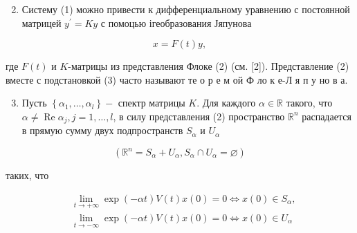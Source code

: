 \documentclass[10pt]{article}
\begin{document}
\begin{enumerate}

  \setcounter{enumi}{1}

  \item Систему (1) можно привести к дифференциальному уравнению с постоянной матрицей $y^{\prime}=K y$ с помоцью ігеобразования Јяпунова

\end{enumerate}



\[

x=F(t) y,

\]



где $F(t)$ и $K$-матрицы из представления Флоке (2) (см. [2]). Представление (2) вместе с подстановкой (3) часто называют те о р е м ой Ф ло к е-Л я п у но в а.



\begin{enumerate}

  \setcounter{enumi}{2}

  \item Пусть $\left\{\alpha_{1}, \ldots, \alpha_{l}\right\}-$ спектр матрицы $K$. Для каждого $\alpha \in \mathbb{R}$ такого, что $\alpha \neq \operatorname{Re} \alpha_{j}, j=1, \ldots, l$, в силу представления (2) пространство $\mathbb{R}^{n}$ распадается в прямую сумму двух подпространств $S_{\alpha}$ и $U_{\alpha}$

\end{enumerate}



\[

\left(\mathbb{R}^{n}=S_{\alpha}+U_{\alpha}, S_{\alpha} \cap U_{\alpha}=\varnothing\right)

\]



таких, что



\[

\begin{aligned}

& \lim _{t \rightarrow+\infty} \exp (-\alpha t) V(t) x(0)=0 \Leftrightarrow x(0) \in S_{\alpha}, \\

& \lim _{t \rightarrow-\infty} \exp (-\alpha t) V(t) x(0)=0 \Leftrightarrow x(0) \in U_{\alpha}

\end{aligned}

\]
\end{document}
